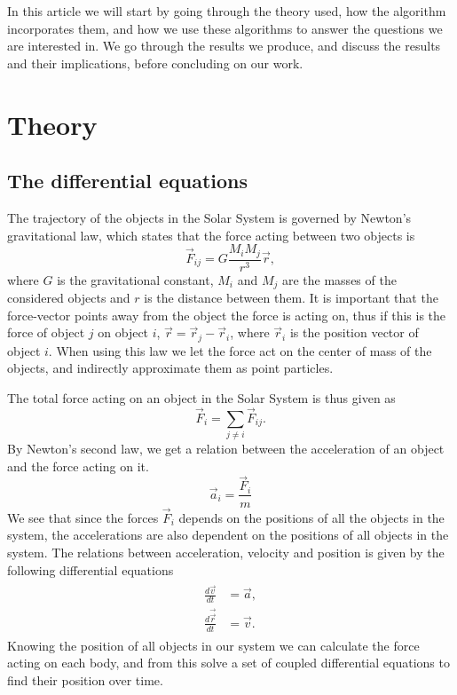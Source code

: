 \documentclass[%
 reprint,
nofootinbib,
aps,
]{revtex4-1}
\begin{document}
In this article we will start by going through the theory used, how the algorithm incorporates them, and how we use these algorithms to answer the questions we are interested in. We go through the results we produce, and discuss the results and their implications, before concluding on our work.

\section{Theory}

\subsection{The differential equations}
The trajectory of the objects in the Solar System is governed by Newton's gravitational law, which states that the force acting between two objects is
\begin{equation}
\vec{F}_{ij} = G\frac{M_i M_j}{r^3}\vec{r}, \label{newton}
\end{equation}
where $G$ is the gravitational constant, $M_i$ and $M_j$ are the masses of the considered objects and $r$ is the distance between them. It is important that the force-vector points away from the object the force is acting on, thus if this is the force of object $j$ on object $i$, $\vec{r} = \vec{r}_j - \vec{r}_i$, where $\vec{r}_i$ is the position vector of object $i$. When using this law we let the force act on the center of mass of the objects, and indirectly approximate them as point particles.

The total force acting on an object in the Solar System is thus given as
\begin{equation}
\vec{F}_i = \sum_{j \neq i} \vec{F}_{ij}.
\end{equation}
By Newton's second law, we get a relation between the acceleration of an object and the force acting on it.
\begin{equation}
\vec{a}_i = \frac{\vec{F}_i}{m}
\end{equation}
We see that since the forces $\vec{F}_i$ depends on the positions of all the objects in the system, the accelerations are also dependent on the positions of all objects in the system. The relations between acceleration, velocity and position is given by the following differential equations
\begin{align}
  \begin{split}
\frac{d\vec{v}}{dt} &= \vec{a},\\
\frac{d\vec{\vec{r}}}{dt} &= \vec{v}. \label{coupled_diff}
  \end{split}
\end{align}
Knowing the position of all objects in our system we can calculate the force acting on each body, and from this solve a set of coupled differential equations to find their position over time.
\end{document}
